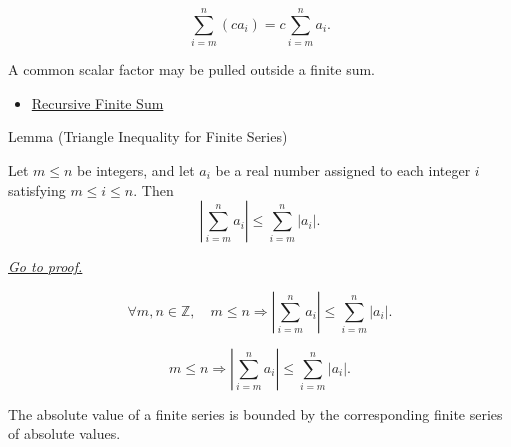 \begin{remark*}
\[
  \sum_{i=m}^{n}(c a_i)
  =
  c\sum_{i=m}^{n}a_i.
\]
\end{remark*}

\begin{remark*}[Interpretation]
A common scalar factor may be pulled outside a finite sum.
\end{remark*}

\begin{dependencies}
\begin{itemize}
  \item \hyperref[def:recursive-finite-sum]{Recursive Finite Sum}
\end{itemize}
\end{dependencies}

\begin{lemmabox}{Lemma (Triangle Inequality for Finite Series)}
\begin{lemma}
\label{lem:triangle-inequality-finite-series}

Let \(m \le n\) be integers, and let \(a_i\) be a real number assigned
to each integer \(i\) satisfying \(m \le i \le n\). Then
\[
  \left\lvert \sum_{i=m}^{n} a_i \right\rvert
  \le
  \sum_{i=m}^{n} \lvert a_i\rvert.
\]

\smallskip
\noindent
\hyperref[prf:triangle-inequality-finite-series]{\textit{Go to proof.}}
\end{lemma}
\end{lemmabox}

\begin{remark*}
\[
  \forall m,n \in \mathbb{Z},\quad
  m \le n
  \Longrightarrow
  \left\lvert \sum_{i=m}^{n} a_i \right\rvert
  \le
  \sum_{i=m}^{n} \lvert a_i\rvert.
\]
\end{remark*}

\begin{remark*}
\[
  m\le n
  \Longrightarrow
  \left|\sum_{i=m}^{n}a_i\right|
  \le
  \sum_{i=m}^{n}|a_i|.
\]
\end{remark*}

\begin{remark*}[Interpretation]
The absolute value of a finite series is bounded by the corresponding
finite series of absolute values.
\end{remark*}

